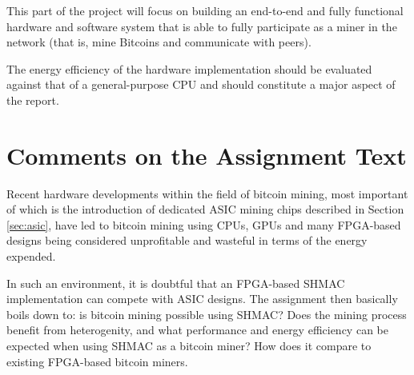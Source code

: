 This part of the project will focus on building an end-to-end and fully functional
hardware and software system that is able to fully participate as a miner in the
network (that is, mine Bitcoins and communicate with peers).

The energy efficiency of the hardware implementation should be evaluated against that
of a general-purpose CPU and should constitute a major aspect of the report.

\section{Comments on the Assignment Text}

Recent hardware developments within the field of bitcoin mining, most important of
which is the introduction of dedicated ASIC mining chips described in Section \ref{sec:asic},
have led to bitcoin mining using CPUs, GPUs and many FPGA-based designs being considered
unprofitable and wasteful in terms of the energy expended.

In such an environment, it is doubtful that an FPGA-based SHMAC implementation can compete
with ASIC designs. The assignment then basically boils down to: is bitcoin mining possible using SHMAC?
Does the mining process benefit from heterogenity, and what performance and energy
efficiency can be expected when using SHMAC as a bitcoin miner? How does it compare to
existing FPGA-based bitcoin miners.


